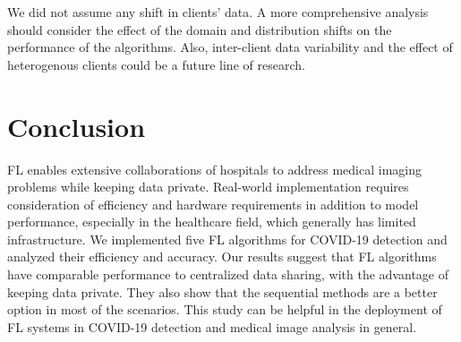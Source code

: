 




We did not assume any shift in clients' data. A more comprehensive analysis should consider the effect of the domain and distribution shifts on the performance of the algorithms. Also, inter-client data variability and the effect of heterogenous clients could be a future line of research.






\section{Conclusion}
\label{sec:conclusion}
 
FL enables extensive collaborations of hospitals to address medical imaging problems while keeping data private. Real-world implementation requires consideration of efficiency and hardware requirements in addition to model performance, especially in the healthcare field, which generally has limited infrastructure. We implemented five FL algorithms for COVID-19 detection and analyzed their efficiency and accuracy.
Our results suggest that FL algorithms have comparable performance to centralized data sharing, with the advantage of keeping data private. They also show that the sequential methods are a better option in most of the scenarios. This study can be helpful in the deployment of FL systems in COVID-19 detection and medical image analysis in general.






\printbibliography
